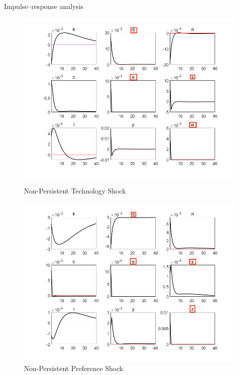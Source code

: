\documentclass[fontset=windows,12pt,t,aspectratio=169]{beamer}
\begin{document}
\begin{frame}{Impulse–response analysis}
    \begin{multicols}{2}
		\begin{figure}
			\includegraphics[scale=0.22]{table/s_fig_tec_non.png}
            \caption*{Non-Persistent Technology Shock}
			\includegraphics[scale=0.22]{table/s_fig_pre_non.png}
            \caption*{Non-Persistent Preference Shock}
		\end{figure}
	\end{multicols}
\end{frame}
\end{document}
